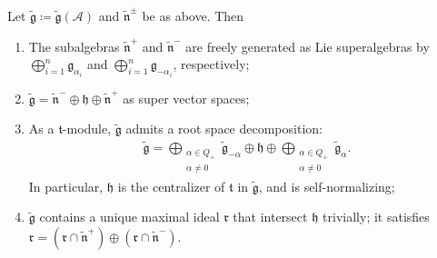 \documentclass[12pt, a4paper, reqno]{amsart}
\theoremstyle{definition}
\theoremstyle{definition}
\theoremstyle{definition}
\numberwithin{theorem}{section}
\numberwithin{lemma}{section}
\numberwithin{remark}{section}
\numberwithin{definition}{section}
\numberwithin{corollary}{section}
\numberwithin{proposition}{section}
\numberwithin{example}{section}
\begin{document}
	\begin{theorem}\label{theorem-half-baked-structure}
		Let \(\tilde{\mathfrak{g}} \coloneq \tilde{\mathfrak{g}}(\mathcal{A})\) and \(\tilde{\mathfrak{n}}^\pm\) be as above. Then
		\begin{enumerate}[label=(\roman*)]
			\item\label{bullet1-half-baked} The subalgebras \(\tilde{\mathfrak{n}}^+\) and \(\tilde{\mathfrak{n}}^-\) are freely generated as Lie superalgebras by \(\bigoplus_{i=1}^n \mathfrak{g}_{\alpha_i}\) and \(\bigoplus_{i=1}^n \mathfrak{g}_{-\alpha_i}\), respectively;
			\item\label{bullet2-half-baked} \(\tilde{\mathfrak{g}} = \tilde{\mathfrak{n}}^- \oplus \mathfrak{h} \oplus \tilde{\mathfrak{n}}^+\) as super vector spaces;
			\item\label{bullet3-half-baked} As a \(\mathfrak{t}\)-module, \(\tilde{\mathfrak{g}}\) admits a root space decomposition:
			\begin{align*}
				\tilde{\mathfrak{g}} = \bigoplus_{\substack{\alpha \in Q_+ \\ \alpha \neq 0}} \tilde{\mathfrak{g}}_{-\alpha} \oplus \mathfrak{h} \oplus \bigoplus_{\substack{\alpha \in Q_+ \\ \alpha \neq 0}} \tilde{\mathfrak{g}}_{\alpha}.
			\end{align*}
			In particular, \(\mathfrak{h}\) is the centralizer of \(\mathfrak{t}\) in \(\tilde{\mathfrak{g}}\), and is self-normalizing;
			\item\label{bullet4-half-baked} \(\tilde{\mathfrak{g}}\) contains a unique maximal ideal \(\mathfrak{r}\) that intersect \(\mathfrak{h}\) trivially; it satisfies \(\mathfrak{r} = (\mathfrak{r}\cap \tilde{\mathfrak{n}}^+)\oplus (\mathfrak{r}\cap \tilde{\mathfrak{n}}^-)\).
		\end{enumerate}
	\end{theorem}
	
\end{document}
